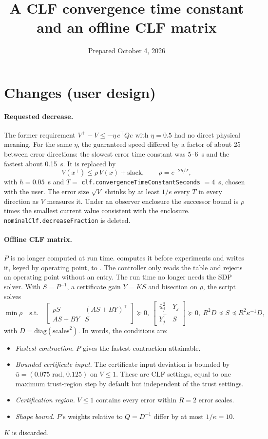 \documentclass[11pt]{article}
\title{A CLF convergence time constant and an offline CLF matrix}
\date{Prepared October 4, 2026}
\begin{document}
\maketitle

\section{Changes (user design)}
\paragraph{Requested decrease.} The former requirement
$V^+-V\le-\eta\,e^\top Qe$ with $\eta=0.5$ had no direct physical meaning. For
the same $\eta$, the guaranteed speed differed by a factor of about 25 between
error directions: the slowest error time constant was 5--6~s and the fastest
about 0.15~s. It is replaced by
\[
V(x^+)\le\rho\,V(x)+\text{slack},\qquad\rho=e^{-2h/T},
\]
with $h=0.05$~s and $T=$ \texttt{clf.convergenceTimeConstantSeconds} $=4$~s,
chosen with the user. The error size $\sqrt V$ shrinks by at least $1/e$ every
$T$ in every direction as $V$ measures it. Under an observer enclosure the
successor bound is $\rho$ times the smallest current value consistent with the
enclosure. \texttt{nominalClf.decreaseFraction} is deleted.

\paragraph{Offline CLF matrix.} $P$ is no longer computed at run time.
 computes it before experiments and
writes it, keyed by operating point, to . The
controller only reads the table and rejects an operating point without an
entry. The run time no longer needs the SDP solver. With $S=P^{-1}$, a
certificate gain $Y=KS$ and bisection on $\rho$, the script solves
\[
\min\rho\quad\text{s.t.}\quad
\begin{bmatrix}\rho S&(AS+BY)^\top\\AS+BY&S\end{bmatrix}\succeq0,\
\begin{bmatrix}\bar u_j^2&Y_j\\Y_j^\top&S\end{bmatrix}\succeq0,\
R^2D\preceq S\preceq R^2\kappa^{-1}D,
\]
with $D=\mathrm{diag}(\text{scales}^2)$. In words, the conditions are:
\begin{itemize}
\item \emph{Fastest contraction.} $P$ gives the fastest contraction attainable.
\item \emph{Bounded certificate input.} The certificate input deviation is
  bounded by $\bar u=(0.075\text{~rad},\,0.125)$ on $V\le1$. These are CLF
  settings, equal to one maximum trust-region step by default but independent
  of the trust settings.
\item \emph{Certification region.} $V\le1$ contains every error within $R=2$
  error scales.
\item \emph{Shape bound.} $P$'s weights relative to $Q=D^{-1}$ differ by at most
  $1/\kappa=10$.
\end{itemize}
$K$ is discarded.
\end{document}
